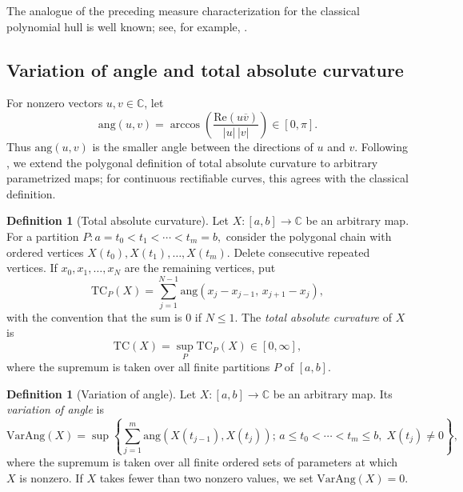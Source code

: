 \documentclass[reqno]{amsart}
\theoremstyle{definition}
\newtheorem{definition}[theorem]{Definition}
\newcommand{\C}{\mathbb{C}}
\newcommand{\ang}{\mathrm{ang}}
\newcommand{\T}{\mathrm{TC}}
\newcommand{\VA}{\mathrm{VarAng}}
\newcommand\Real{\mathrm{Re}}
\numberwithin{equation}{section}
\begin{document}
The analogue of the preceding measure characterization for the classical polynomial hull is well known; see, for example, \cite[Section~1.2]{St}. 

\subsection{Variation of angle and total absolute curvature} 

For nonzero vectors $u,v\in\mathbb C$, let
\[\ang(u,v)=\arccos\!\left(
        \frac{\Real(u\overline v)}{|u|\,|v|}\right)\in[0,\pi].\]
Thus $\ang(u,v)$ is the smaller angle between the directions of
$u$ and $v$. Following \cite{M}, we extend the polygonal definition of total absolute curvature to arbitrary parametrized maps; for continuous rectifiable curves, this agrees with the classical definition.
\begin{definition}[Total absolute curvature]\label{D1}
Let $X:[a,b]\to\C$ be an arbitrary map.  For a partition
$P:a=t_0<t_1<\cdots<t_m=b,$
consider the polygonal chain with ordered vertices
$X(t_0),X(t_1),\ldots,X(t_m).$
Delete consecutive repeated vertices.  If $x_0,x_1,\ldots,x_N$
are the remaining vertices, put
\[\T_P(X)=\sum_{j=1}^{N-1}\ang(x_j-x_{j-1},\,x_{j+1}-x_j),\]
with the convention that the sum is $0$ if $N\leq 1$.
The \emph{total absolute curvature} of $X$ is
\[\T(X)=\sup_P \T_P(X)\in[0,\infty],\]
where the supremum is taken over all finite partitions $P$ of $[a,b]$.
\end{definition}

\begin{definition}[Variation of angle]\label{D2}
Let $X:[a,b]\to\mathbb C$ be an arbitrary map.  Its \emph{variation of angle} is
\[\VA(X)=\sup
    \left\{
        \sum_{j=1}^{m}
        \ang\left(X(t_{j-1}),X(t_j)\right);\,
        a\leq t_0<\cdots<t_m\leq b,\;
        X(t_j)\neq 0
    \right\},
\]
where the supremum is taken over all finite ordered sets of
parameters at which $X$ is nonzero.  If $X$ takes fewer than two
nonzero values, we set $\VA(X)=0$.
\end{definition}
\end{document}
